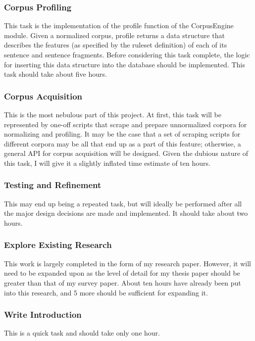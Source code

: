 \documentclass[10pt]{article}
\begin{document}
\subsubsection{Corpus Profiling}
This task is the implementation of the profile function of the CorpusEngine
module. Given a normalized corpus, profile returns a data structure that
describes the features (as specified by the ruleset definition) of each of its
sentence and sentence fragments. Before considering this task complete, the
logic for inserting this data structure into the database should be
implemented. This task should take about five hours.

\subsubsection{Corpus Acquisition}
This is the most nebulous part of this project. At first, this task will be
represented by one-off scripts that scrape and prepare unnormalized corpora for
normalizing and profiling. It may be the case that a set of scraping scripts
for different corpora may be all that end up as a part of this feature;
otherwise, a general API for corpus acquisition will be designed. Given the
dubious nature of this task, I will give it a slightly inflated time estimate
of ten hours.

\subsubsection{Testing and Refinement}
This may end up being a repeated task, but will ideally be performed after all
the major design decisions are made and implemented. It should take about two
hours.

\subsubsection{Explore Existing Research} 
This work is largely completed in the form of my research paper. However, it
will need to be expanded upon as the level of detail for my thesis paper should
be greater than that of my survey paper.  About ten hours have already been put
into this research, and 5 more should be sufficient for expanding it.

\subsubsection{Write Introduction}
This is a quick task and should take only one hour.
\end{document}
